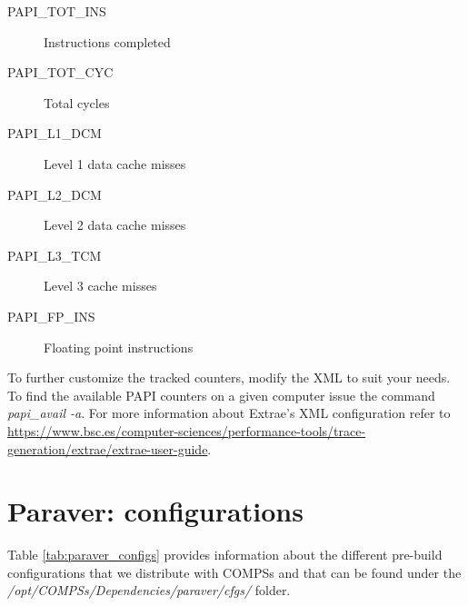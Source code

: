 \begin{description}
 \item [PAPI\_TOT\_INS] Instructions completed
 \item [PAPI\_TOT\_CYC] Total cycles
 \item [PAPI\_L1\_DCM] Level 1 data cache misses
 \item [PAPI\_L2\_DCM] Level 2 data cache misses
 \item [PAPI\_L3\_TCM] Level 3 cache misses
 \item [PAPI\_FP\_INS] Floating point instructions
\end{description}


To further customize the tracked counters, modify the XML to suit your needs. To find the available PAPI counters on a given computer issue the command \textit{papi\_avail -a}. For more information about Extrae's XML configuration refer to \url{https://www.bsc.es/computer-sciences/performance-tools/trace-generation/extrae/extrae-user-guide}.

\section{Paraver: configurations}
\label{sec:configs}

Table \ref{tab:paraver_configs} provides information about the different pre-build configurations that we distribute
with COMPSs and that can be found under the \textit{/opt/COMPSs/Dependencies/paraver/cfgs/} folder.


